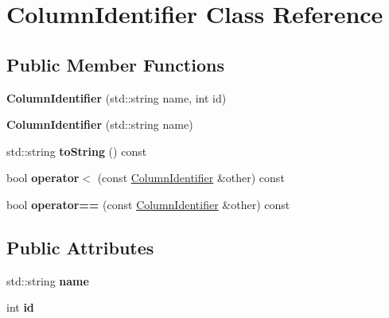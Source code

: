 \hypertarget{class_column_identifier}{\section{Column\+Identifier Class Reference}
\label{class_column_identifier}
}
\subsection*{Public Member Functions}
\begin{DoxyCompactItemize}
\item 
\hypertarget{class_column_identifier_a3fae121a889e26575b1b2e6ebad16d6e}{{\bfseries Column\+Identifier} (std\+::string name, int id)}\label{class_column_identifier_a3fae121a889e26575b1b2e6ebad16d6e}

\item 
\hypertarget{class_column_identifier_ac9bd3a91e6e885751182d082b28d5fb0}{{\bfseries Column\+Identifier} (std\+::string name)}\label{class_column_identifier_ac9bd3a91e6e885751182d082b28d5fb0}

\item 
\hypertarget{class_column_identifier_ae6b2e2ce0ac26d356a451ec3d975a1be}{std\+::string {\bfseries to\+String} () const }\label{class_column_identifier_ae6b2e2ce0ac26d356a451ec3d975a1be}

\item 
\hypertarget{class_column_identifier_a07e32ed45a2b7c8e09f0358fd31a1f74}{bool {\bfseries operator$<$} (const \hyperlink{class_column_identifier}{Column\+Identifier} \&other) const }\label{class_column_identifier_a07e32ed45a2b7c8e09f0358fd31a1f74}

\item 
\hypertarget{class_column_identifier_a3833af96f5281573cae9a70c440c1cce}{bool {\bfseries operator==} (const \hyperlink{class_column_identifier}{Column\+Identifier} \&other) const }\label{class_column_identifier_a3833af96f5281573cae9a70c440c1cce}

\end{DoxyCompactItemize}
\subsection*{Public Attributes}
\begin{DoxyCompactItemize}
\item 
\hypertarget{class_column_identifier_af401adcef91c0fb4087102182dddb6ea}{std\+::string {\bfseries name}}\label{class_column_identifier_af401adcef91c0fb4087102182dddb6ea}

\item 
\hypertarget{class_column_identifier_ade5213e0ceeb1ba3fd948e9dc9975a53}{int {\bfseries id}}\label{class_column_identifier_ade5213e0ceeb1ba3fd948e9dc9975a53}

\end{DoxyCompactItemize}


